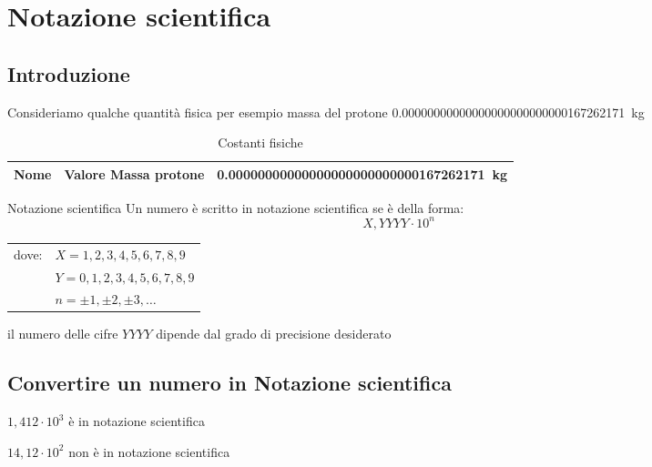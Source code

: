 \chapter{Notazione scientifica}
\section{Introduzione}
Consideriamo qualche quantità fisica per esempio massa del protone \SI{0,00000000000000000000000000167262171}{\kilogram}


\begin{table}
	\centering
	\begin{tabular}{ls}
		\toprule
		Nome&Valore
		\midrule
	Massa protone&\SI{0,00000000000000000000000000167262171}{\kilogram}\\
		\bottomrule
	\end{tabular}
\caption{Costanti fisiche}
\label{tab:costantifisiche1}
\end{table}
\label{cha:NotazioneScientifica}
\begin{definizionet}{Notazione scientifica}{}
Un numero è scritto in notazione scientifica se è della forma:
\[X,YYYY \cdot 10^n \]
\begin{tabular}{ll}
dove:&    $X=1,2,3,4,5,6,7,8,9$  \\ 
	    &     $ Y=0,1,2,3,4,5,6,7,8,9$ \\ 
	   &  $n=\pm 1, \pm 2,\pm 3,\ldots$\\
\end{tabular}
 
il numero delle cifre $YYYY$ dipende dal grado di precisione desiderato
\end{definizionet}
\section{Convertire un numero in Notazione scientifica}
\begin{esempiot}{}{}
	$1,412\cdot 10^3$ è in notazione scientifica
	
	$14,12\cdot 10^2$ non è in notazione scientifica
\end{esempiot}
